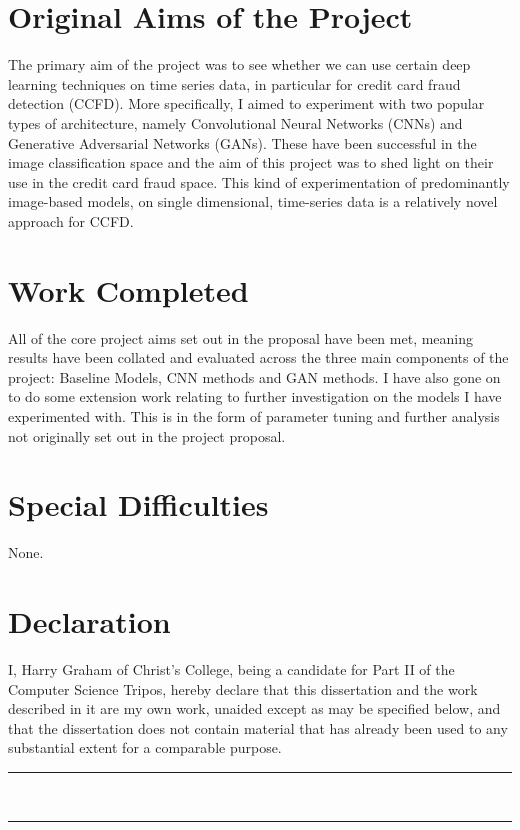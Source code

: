 \documentclass[12pt,a4paper,twoside]{report}
\begin{document}
\section*{Original Aims of the Project}
The primary aim of the project was to see whether we can use certain deep learning techniques on time series data, in particular for credit card fraud detection (CCFD). More specifically, I aimed to experiment with two popular types of architecture, namely Convolutional Neural Networks (CNNs)  \cite{DBLP:journals/corr/SimonyanZ14a} and Generative Adversarial Networks (GANs). These have been successful in the image classification space and the aim of this project was to shed light on their use in the credit card fraud space. This kind of experimentation of predominantly image-based models, on single dimensional, time-series data is a relatively novel approach for CCFD.

\section*{Work Completed}
All of the core project aims set out in the proposal have been met, meaning results have been collated and evaluated across the three main components of the project: Baseline Models, CNN methods and GAN methods. 
I have also gone on to do some extension work relating to further investigation on the models I have experimented with. This is in the form of parameter tuning and further analysis not originally set out in the project proposal.

\section*{Special Difficulties}
None.


\newpage

\section*{Declaration}

I, Harry Graham of Christ's College, being a candidate for Part II of the Computer Science Tripos, hereby declare that this dissertation and the work described in it are my own work, unaided except as may be specified below, and that the dissertation does not contain material that has already been used to any substantial extent for a comparable purpose.

\vspace{1cm}
\begin{multicols}{2}

\rule{5cm}{0.15mm} \\

\columnbreak

\rule{5cm}{0.15mm} \\

\end{multicols}
\end{document}
